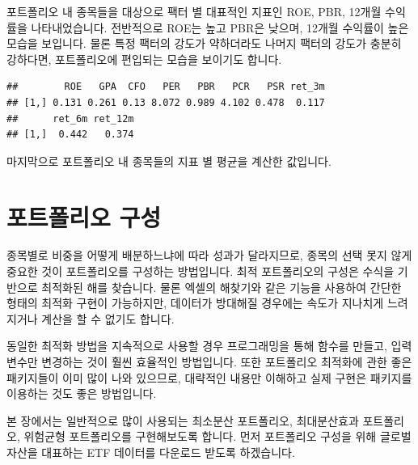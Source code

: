 \documentclass[12pt,]{book}
\newenvironment{Shaded}{\begin{snugshade}}{\end{snugshade}}
\newcommand{\DecValTok}[1]{\textcolor[rgb]{0.00,0.00,0.81}{#1}}
\newcommand{\KeywordTok}[1]{\textcolor[rgb]{0.13,0.29,0.53}{\textbf{#1}}}
\newcommand{\NormalTok}[1]{#1}
\newcommand{\OperatorTok}[1]{\textcolor[rgb]{0.81,0.36,0.00}{\textbf{#1}}}
\newcommand{\StringTok}[1]{\textcolor[rgb]{0.31,0.60,0.02}{#1}}
\begin{document}
포트폴리오 내 종목들을 대상으로 팩터 별 대표적인 지표인 ROE, PBR, 12개월 수익률을 나타내었습니다. 전반적으로 ROE는 높고 PBR은 낮으며, 12개월 수익률이 높은 모습을 보입니다. 물론 특정 팩터의 강도가 약하더라도 나머지 팩터의 강도가 충분히 강하다면, 포트폴리오에 편입되는 모습을 보이기도 합니다.

\begin{Shaded}
\end{Shaded}

\begin{verbatim}
##        ROE   GPA  CFO   PER   PBR   PCR   PSR ret_3m
## [1,] 0.131 0.261 0.13 8.072 0.989 4.102 0.478  0.117
##      ret_6m ret_12m
## [1,]  0.442   0.374
\end{verbatim}

마지막으로 포트폴리오 내 종목들의 지표 별 평균을 계산한 값입니다.

\hypertarget{section-68}{%
\chapter{포트폴리오 구성}\label{section-68}}

종목별로 비중을 어떻게 배분하느냐에 따라 성과가 달라지므로, 종목의 선택 못지 않게 중요한 것이 포트폴리오를 구성하는 방법입니다. 최적 포트폴리오의 구성은 수식을 기반으로 최적화된 해를 찾습니다. 물론 엑셀의 해찾기와 같은 기능을 사용하여 간단한 형태의 최적화 구현이 가능하지만, 데이터가 방대해질 경우에는 속도가 지나치게 느려지거나 계산을 할 수 없기도 합니다.

동일한 최적화 방법을 지속적으로 사용할 경우 프로그래밍을 통해 함수를 만들고, 입력 변수만 변경하는 것이 훨씬 효율적인 방법입니다. 또한 포트폴리오 최적화에 관한 좋은 패키지들이 이미 많이 나와 있으므로, 대략적인 내용만 이해하고 실제 구현은 패키지를 이용하는 것도 좋은 방법입니다.

본 장에서는 일반적으로 많이 사용되는 최소분산 포트폴리오, 최대분산효과 포트폴리오, 위험균형 포트폴리오를 구현해보도록 합니다. 먼저 포트폴리오 구성을 위해 글로벌 자산을 대표하는 ETF 데이터를 다운로드 받도록 하겠습니다.
\end{document}
